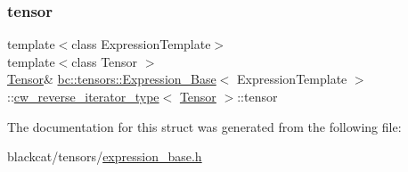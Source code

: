 \mbox{\label{structbc_1_1tensors_1_1Expression__Base_1_1cw__reverse__iterator__type_a2fc2eb2b5fe257af76392b1843d6fafe}} 
\subsubsection{\texorpdfstring{tensor}{tensor}}
{\footnotesize\ttfamily template$<$class Expression\+Template$>$ \\
template$<$class Tensor $>$ \\
\hyperlink{namespacebc_a659391e47ab612be3ba6c18cf9c89159}{Tensor}\& \hyperlink{classbc_1_1tensors_1_1Expression__Base}{bc\+::tensors\+::\+Expression\+\_\+\+Base}$<$ Expression\+Template $>$\+::\hyperlink{structbc_1_1tensors_1_1Expression__Base_1_1cw__reverse__iterator__type}{cw\+\_\+reverse\+\_\+iterator\+\_\+type}$<$ \hyperlink{namespacebc_a659391e47ab612be3ba6c18cf9c89159}{Tensor} $>$\+::tensor}



The documentation for this struct was generated from the following file\+:\begin{DoxyCompactItemize}
\item 
blackcat/tensors/\hyperlink{expression__base_8h}{expression\+\_\+base.\+h}\end{DoxyCompactItemize}
